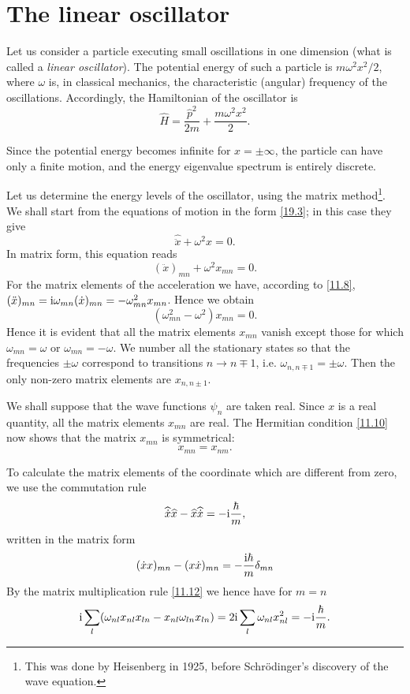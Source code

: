 \section{The linear oscillator}\label{The linear oscillator}
Let us consider a particle executing small oscillations in one dimension (what is called a \textit{linear oscillator}). The potential energy of such a particle is $ m\omega^2x^2/2 $, where $\omega$ is, in classical mechanics, the characteristic (angular) frequency of the oscillations. Accordingly, the Hamiltonian of the oscillator is
\begin{equation}\label{23.1}
\hat{H}=\frac{\hat{p}^2}{2m}+\frac{m\omega^2x^2}{2}.
\end{equation}


Since the potential energy becomes infinite for $ x = \pm\infty $, the particle can have only a finite motion, and the energy eigenvalue spectrum is entirely discrete.

Let us determine the energy levels of the oscillator, using the matrix method\footnote{This was done by Heisenberg in 1925, before Schr\"odinger's discovery of the wave equation.}. We shall start from the equations of motion in the form \eqref{19.3}; in this case they give
\begin{equation}\label{23.2}
\hat{\ddot{x}}+\omega^2x=0.
\end{equation}
In matrix form, this equation reads
\[ (\ddot{x})_{mn}+\omega^2x_{mn}=0. \]
For the matrix elements of the acceleration we have, according to \eqref{11.8}, $(\ddot{x})_{mn}=\mathrm{i}\omega_{mn}(\dot{x})_{mn}=-\omega_{mn}^2x_{mn}  $. Hence we obtain
\[ (\omega_{mn}^2-\omega^2)x_{mn}=0. \]
Hence it is evident that all the matrix elements $ x_{mn} $ vanish except those for which $ \omega_{mn}=\omega $ or $ \omega_{mn}=-\omega $. We number all the stationary states so that the frequencies $ \pm\omega $ correspond to transitions $ n\to n\mp 1$, i.e. $ \omega_{n,n\mp1}=\pm\omega $. Then the only non-zero matrix elements are $ x_{n,n\pm1} $.

We shall suppose that the wave functions $\psi_n$ are taken real. Since $ x $ is a real quantity, all the matrix elements $ x_{mn} $ are real. The Hermitian condition \eqref{11.10} now shows that the matrix $ x_{mn} $ is symmetrical:
\[ x_{mn}=x_{nm}. \]



To calculate the matrix elements of the coordinate which are different from zero, we use the commutation rule
\[ \widehat{\dot{x}}\widehat{x}-\widehat{x}\widehat{\dot{x}}=-\mathrm{i}\frac{\hbar}{m}, \]
written in the matrix form
\[ (\dot{x}x)_{mn}-(x\dot{x})_{mn}=-\frac{\mathrm{i}\hbar}{m}\delta_{mn} \]
By the matrix multiplication rule \eqref{11.12} we hence have for $ m = n $
\[ \mathrm{i}\sum_l(\omega_{nl}x_{nl}x_{ln}-x_{nl}\omega_{ln}x_{ln}) =2\mathrm{i}\sum_l\omega_{nl}x_{nl}^2=-\mathrm{i}\frac{\hbar}{m}.\]



